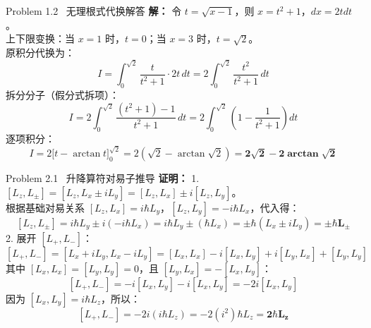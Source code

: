 \documentclass[a4paper,11pt]{article}
\begin{document}
\begin{solution}{Problem 1.2 \textbar\ 无理根式代换解答}
\textbf{解：}
令 $t = \sqrt{x - 1}$，则 $x = t^2 + 1$，$dx = 2t dt$。\\
上下限变换：当 $x = 1$ 时，$t = 0$；当 $x = 3$ 时，$t = \sqrt{2}$。\\
原积分代换为：
\[ I = \int_0^{\sqrt{2}} \frac{t}{t^2 + 1} \cdot 2t \, dt = 2 \int_0^{\sqrt{2}} \frac{t^2}{t^2 + 1} \, dt \]
拆分分子（假分式拆项）：
\[ I = 2 \int_0^{\sqrt{2}} \frac{(t^2 + 1) - 1}{t^2 + 1} \, dt = 2 \int_0^{\sqrt{2}} \left( 1 - \frac{1}{t^2 + 1} \right) dt \]
逐项积分：
\[ I = 2 \Big[ t - \arctan t \Big]_0^{\sqrt{2}} = 2 \left( \sqrt{2} - \arctan\sqrt{2} \right) = \mathbf{2\sqrt{2} - 2\arctan\sqrt{2}} \]
\end{solution}

\begin{solution}{Problem 2.1 \textbar\ 升降算符对易子推导}
\textbf{证明：}
1. $[L_z, L_\pm] = [L_z, L_x \pm i L_y] = [L_z, L_x] \pm i[L_z, L_y]$。\\
根据基础对易关系 $[L_z, L_x] = i\hbar L_y$，$[L_z, L_y] = -i\hbar L_x$，代入得：
\[ [L_z, L_\pm] = i\hbar L_y \pm i(-i\hbar L_x) = i\hbar L_y \pm (\hbar L_x) = \pm \hbar (L_x \pm i L_y) = \mathbf{\pm \hbar L_\pm} \]
2. 展开 $[L_+, L_-]$：
\[ [L_+, L_-] = [L_x + iL_y, L_x - iL_y] = [L_x, L_x] - i[L_x, L_y] + i[L_y, L_x] + [L_y, L_y] \]
其中 $[L_x, L_x] = [L_y, L_y] = 0$，且 $[L_y, L_x] = -[L_x, L_y]$：
\[ [L_+, L_-] = -i[L_x, L_y] - i[L_x, L_y] = -2i [L_x, L_y] \]
因为 $[L_x, L_y] = i\hbar L_z$，所以：
\[ [L_+, L_-] = -2i(i\hbar L_z) = -2(i^2)\hbar L_z = \mathbf{2\hbar L_z} \]
\end{solution}
\end{document}

